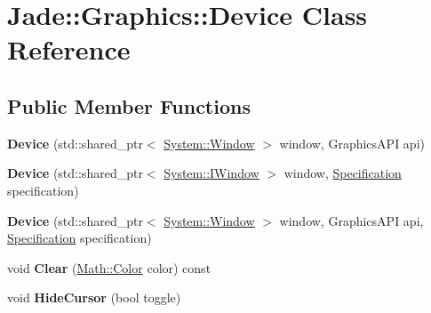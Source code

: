 \hypertarget{class_jade_1_1_graphics_1_1_device}{}\section{Jade\+:\+:Graphics\+:\+:Device Class Reference}
\label{class_jade_1_1_graphics_1_1_device}
\subsection*{Public Member Functions}
\begin{DoxyCompactItemize}
\item 
\hypertarget{class_jade_1_1_graphics_1_1_device_ab6401c87d598e78d24406851054d31bf}{}{\bfseries Device} (std\+::shared\+\_\+ptr$<$ \hyperlink{class_jade_1_1_system_1_1_window}{System\+::\+Window} $>$ window, Graphics\+A\+P\+I api)\label{class_jade_1_1_graphics_1_1_device_ab6401c87d598e78d24406851054d31bf}

\item 
\hypertarget{class_jade_1_1_graphics_1_1_device_a44eed8c6de3bf0ea507204eaef8fe88e}{}{\bfseries Device} (std\+::shared\+\_\+ptr$<$ \hyperlink{struct_jade_1_1_system_1_1_i_window}{System\+::\+I\+Window} $>$ window, \hyperlink{struct_jade_1_1_graphics_1_1_specification}{Specification} specification)\label{class_jade_1_1_graphics_1_1_device_a44eed8c6de3bf0ea507204eaef8fe88e}

\item 
\hypertarget{class_jade_1_1_graphics_1_1_device_a95204aaf8684bd12c7a098a90ea0e3a3}{}{\bfseries Device} (std\+::shared\+\_\+ptr$<$ \hyperlink{class_jade_1_1_system_1_1_window}{System\+::\+Window} $>$ window, Graphics\+A\+P\+I api, \hyperlink{struct_jade_1_1_graphics_1_1_specification}{Specification} specification)\label{class_jade_1_1_graphics_1_1_device_a95204aaf8684bd12c7a098a90ea0e3a3}

\item 
\hypertarget{class_jade_1_1_graphics_1_1_device_acf66d5f61f5489f8081fea84b3752ac3}{}void {\bfseries Clear} (\hyperlink{struct_jade_1_1_math_1_1_color}{Math\+::\+Color} color) const \label{class_jade_1_1_graphics_1_1_device_acf66d5f61f5489f8081fea84b3752ac3}

\item 
\hypertarget{class_jade_1_1_graphics_1_1_device_a0808ac953233cdf240789f7e0dd678ce}{}void {\bfseries Hide\+Cursor} (bool toggle)\label{class_jade_1_1_graphics_1_1_device_a0808ac953233cdf240789f7e0dd678ce}


\end{DoxyCompactItemize}
